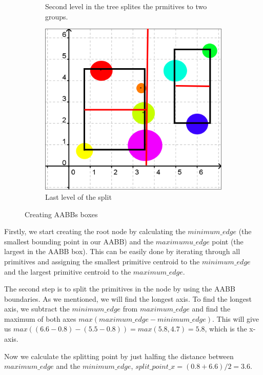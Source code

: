 \documentclass[11pt,a4paper]{article}
\begin{document}
\begin{figure}[h]
\begin{subfigure}[b]{0.3\textwidth}
         \caption{Second level in the tree splites the prmitives to two groups.}
         \label{fig:pi_5000}
     \end{subfigure}
     \hfill
     \begin{subfigure}[b]{0.3\textwidth}
         \centering
         \includegraphics[width=\textwidth]{images/example_bvh/4.png}
         \caption{Last level of the split}
         \label{fig:pi_18000}
     \end{subfigure}
        \caption{Creating AABBs boxes}
        \label{fig:three graphs}
\end{figure}

Firstly, we start creating the root node by calculating the $minimum\_edge$ (the smallest bounding point in our AABB) and the $maximumu\_edge$ point (the largest in the AABB box). This can be easily done by iterating through all primitives and assigning the smallest primitive centroid to the  $minimum\_edge$ and the largest primitive centroid to the $maximum\_edge$.

The second step is to split the primitives in the node by using the AABB boundaries. As we mentioned, we will find the longest axis.
To find the longest axis, we subtract the $minimum\_edge$ from $maximum\_edge $ and find the maximum of both axes $max(maximum\_edge - minimum\_edge)$. This will give us $max((6.6-0.8) - (5.5-0.8)) = max(5.8,4.7) = 5.8$, which is the x-axis. 

Now we calculate the splitting point by just halfing the distance between $maximum\_edge $ and the $minimum\_edge$, $split\_point\_x = (0.8+6.6) / 2 = 3.6$.
\end{document}
